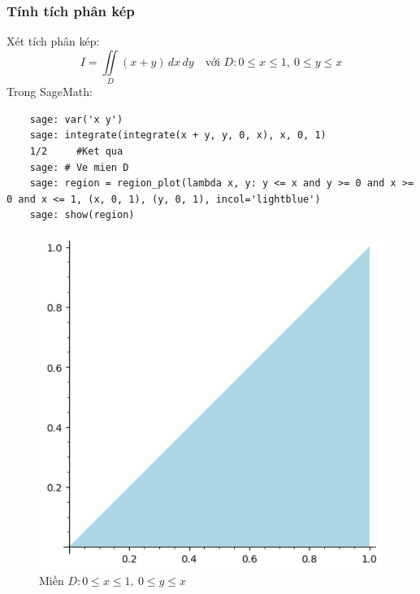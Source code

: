 \subsubsection{Tính tích phân kép}
Xét tích phân kép:
\[ I = \iint\limits_D (x + y) \, dx \, dy \quad \text{với } D: 0 \le x \le 1, \ 0 \le y \le x \]
Trong SageMath:
\begin{lstlisting}
	sage: var('x y')
	sage: integrate(integrate(x + y, y, 0, x), x, 0, 1)
	1/2		#Ket qua
	sage: # Ve mien D
	sage: region = region_plot(lambda x, y: y <= x and y >= 0 and x >= 0 and x <= 1, (x, 0, 1), (y, 0, 1), incol='lightblue')
	sage: show(region)
\end{lstlisting}
\begin{figure}[H]
	\centering
	\includegraphics[width=0.7\linewidth]{images/5211}
	\caption{Miền $D: 0 \le x \le 1, \ 0 \le y \le x$}
	\label{fig:5211}
\end{figure}

